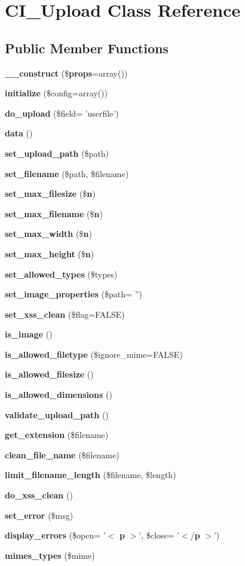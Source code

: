 \section{C\-I\-\_\-\-Upload Class Reference}
\label{class_c_i___upload}
\subsection*{Public Member Functions}
\begin{DoxyCompactItemize}
\item 
{\bf \-\_\-\-\_\-construct} (\${\bf props}=array())
\item 
{\bf initialize} (\$config=array())
\item 
{\bf do\-\_\-upload} (\$field= 'userfile')
\item 
{\bf data} ()
\item 
{\bf set\-\_\-upload\-\_\-path} (\$path)
\item 
{\bf set\-\_\-filename} (\$path, \$filename)
\item 
{\bf set\-\_\-max\-\_\-filesize} (\${\bf n})
\item 
{\bf set\-\_\-max\-\_\-filename} (\${\bf n})
\item 
{\bf set\-\_\-max\-\_\-width} (\${\bf n})
\item 
{\bf set\-\_\-max\-\_\-height} (\${\bf n})
\item 
{\bf set\-\_\-allowed\-\_\-types} (\$types)
\item 
{\bf set\-\_\-image\-\_\-properties} (\$path= '')
\item 
{\bf set\-\_\-xss\-\_\-clean} (\$flag=F\-A\-L\-S\-E)
\item 
{\bf is\-\_\-image} ()
\item 
{\bf is\-\_\-allowed\-\_\-filetype} (\$ignore\-\_\-mime=F\-A\-L\-S\-E)
\item 
{\bf is\-\_\-allowed\-\_\-filesize} ()
\item 
{\bf is\-\_\-allowed\-\_\-dimensions} ()
\item 
{\bf validate\-\_\-upload\-\_\-path} ()
\item 
{\bf get\-\_\-extension} (\$filename)
\item 
{\bf clean\-\_\-file\-\_\-name} (\$filename)
\item 
{\bf limit\-\_\-filename\-\_\-length} (\$filename, \$length)
\item 
{\bf do\-\_\-xss\-\_\-clean} ()
\item 
{\bf set\-\_\-error} (\$msg)
\item 
{\bf display\-\_\-errors} (\$open= '$<$ {\bf p} $>$', \$close= '$<$/{\bf p} $>$')
\item 
{\bf mimes\-\_\-types} (\$mime)
\end{DoxyCompactItemize}
